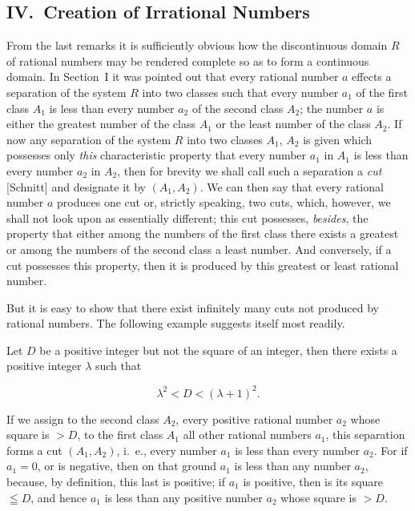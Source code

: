 \documentclass[polutonikogreek,english,twoside,openright]{article}
\begin{document}
\subsection*{IV.\ Creation of Irrational Numbers}
\label{EISIV}

From the last remarks it is sufficiently obvious how the discontinuous
domain $R$ of rational numbers may be rendered complete so as to form
a continuous domain. In Section~I it was pointed out that every
rational number $a$ effects a separation of the system $R$ into two
classes such that every number $a_1$ of the first class $A_1$ is less
than every number $a_2$ of the second class $A_2$; the number $a$ is
either the greatest number of the class $A_1$ or the least number of
the class $A_2$. If now any separation of the system $R$ into two
classes $A_1$, $A_2$ is given which possesses only \textit{this}
characteristic property that every number $a_1$ in $A_1$ is less than
every number $a_2$ in $A_2$, then for brevity we shall call such a
separation a \textit{cut} [Schnitt] and designate it by $(A_1, A_2)$.
We can then say that every rational number $a$ produces one cut or,
strictly speaking, two cuts, which, however, we shall not look upon as
essentially different; this cut possesses, \textit{besides}, the
property that either among the numbers of the first class there exists
a greatest or among the numbers of the second class a least
number. And conversely, if a cut possesses this property, then it is
produced by this greatest or least rational number.

But it is easy to show that there exist infinitely many cuts not
produced by rational numbers. The following example suggests itself
most readily.

Let $D$ be a positive integer\label{DposNotSq} but not the square of
an integer, then there exists a positive integer $\lambda$ such that

\[
\lambda^2 < D <(\lambda + 1)^2.
\]

If we assign to the second class $A_2$, every positive rational number
$a_2$ whose square is $> D$, to the first class $A_1$ all other
rational numbers $a_1$, this separation forms a cut $(A_1, A_2)$,
i.~e., every number $a_1$ is less than every number $a_2$. For if
$a_1 = 0$, or is negative, then on that ground $a_1$ is less than any
number $a_2$, because, by definition, this last is positive; if $a_1$
is positive, then is its square $\leqq D$, and hence $a_1$ is less
than any positive number $a_2$ whose square is $> D$.
\end{document}
